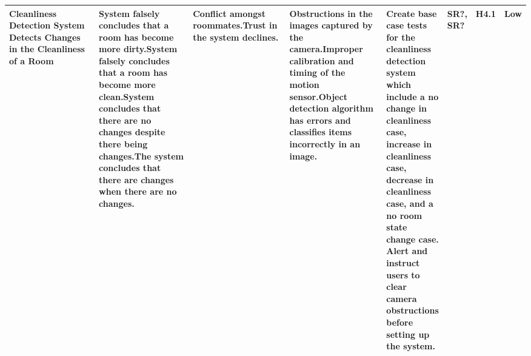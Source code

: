 \documentclass{article}
\begin{document}
\begin{table}[H]
\begin{adjustbox}{width=\textwidth}
\begin{tabular}{|p{0.25\linewidth} | p{0.25\linewidth} | p{0.22\linewidth}|  p{0.22\linewidth}|  p{0.30\linewidth}|  p{0.085\linewidth}|  p{0.05\linewidth}|p{0.12\linewidth}| }
         \hline
         Cleanliness Detection System Detects Changes in the Cleanliness of a Room & System falsely concludes that a room has become more dirty.\newline\newline System falsely concludes that a room has become more clean.\newline\newline System concludes that there are no changes despite there being changes.\newline\newline The system concludes that there are changes when there are no changes. & Conflict amongst roommates.\newline\newline Trust in the system declines. & Obstructions in the images captured by the camera.\newline\newline Improper calibration and timing of the motion sensor.\newline\newline Object detection algorithm has errors and classifies items incorrectly in an image.& Create base case tests for the cleanliness detection system which include a no change in cleanliness case, increase in cleanliness case, decrease in cleanliness case, and a no room state change case. \newline\newline Alert and instruct users to clear camera obstructions before setting up the system. & SR?, SR? & H4.1 & Low\\
         \hline
         

\end{tabular}
\end{adjustbox}
\end{table}
\end{document}
